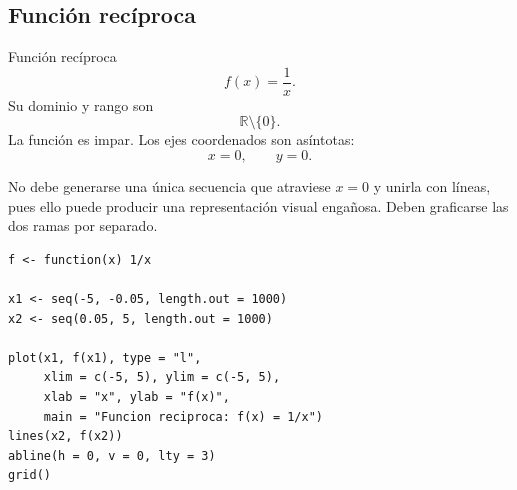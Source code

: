 \documentclass[aspectratio=169,10pt]{beamer}
\newcommand{\R}{\mathbb{R}}
\begin{document}
\subsection{Función recíproca}
\begin{frame}{Función recíproca}
\[
f(x)=\frac{1}{x}.
\]
Su dominio y rango son
\[
\R\setminus\{0\}.
\]
La función es impar. Los ejes coordenados son asíntotas:
\[
x=0,\qquad y=0.
\]

No debe generarse una única secuencia que atraviese $x=0$ y unirla con líneas,
pues ello puede producir una representación visual engañosa. Deben graficarse
las dos ramas por separado.

\begin{center}
\end{center}

\begin{verbatim}
f <- function(x) 1/x

x1 <- seq(-5, -0.05, length.out = 1000)
x2 <- seq(0.05, 5, length.out = 1000)

plot(x1, f(x1), type = "l",
     xlim = c(-5, 5), ylim = c(-5, 5),
     xlab = "x", ylab = "f(x)",
     main = "Funcion reciproca: f(x) = 1/x")
lines(x2, f(x2))
abline(h = 0, v = 0, lty = 3)
grid()
\end{verbatim}

\end{frame}
\end{document}
